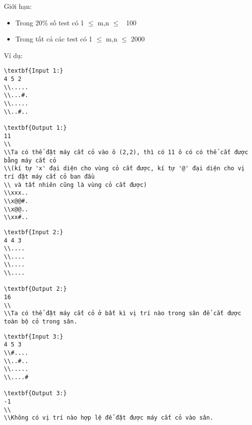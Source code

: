 Giới hạn:
\begin{itemize}
	\item     Trong 20\% số test có 1  $\le$  m,n  $\le$  100   
	\item     Trong tất cả các test có 1  $\le$  m,n  $\le$  2000   
\end{itemize}
Ví dụ:
\begin{verbatim}
\textbf{Input 1:}
4 5 2
\\.....
\\...#.
\\.....
\\..#..

\textbf{Output 1:}
11
\\
\\Ta có thể đặt máy cắt cỏ vào ô (2,2), thì có 11 ô có có thể cắt được bằng máy cắt cỏ
\\(kí tự 'x' đại diện cho vùng cỏ cắt được, kí tự '@' đại diện cho vị trí đặt máy cắt cỏ ban đầu
\\ và tất nhiên cũng là vùng cỏ cắt được)
\\xxx..
\\x@@#.
\\x@@..
\\xx#..\end{verbatim}
\begin{verbatim}
\textbf{Input 2:}
4 4 3
\\....
\\....
\\....
\\....

\textbf{Output 2:}
16
\\
\\Ta có thể đặt máy cắt cỏ ở bất kì vị trí nào trong sân để cắt được toàn bộ cỏ trong sân.\end{verbatim}
\begin{verbatim}
\textbf{Input 3:}
4 5 3
\\#....
\\..#..
\\.....
\\....#

\textbf{Output 3:}
-1
\\
\\Không có vị trí nào hợp lệ để đặt được máy cắt cỏ vào sân.\end{verbatim}